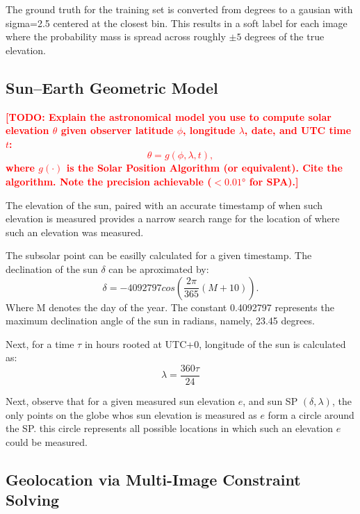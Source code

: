 \documentclass[conference]{IEEEtran}
\newcommand{\todo}[1]{\textcolor{red}{\textbf{[TODO: #1]}}}
\begin{document}
The ground truth for the training set is converted from degrees to a gausian with sigma=2.5 centered at the closest bin.
This results in a soft label for each image where the probability mass is spread across roughly $\pm5$ degrees of the true elevation.

\subsection{Sun--Earth Geometric Model}

\todo{Explain the astronomical model you use to compute solar elevation $\theta$
given observer latitude $\phi$, longitude $\lambda$, date, and UTC time $t$:
\begin{equation}
    \theta = g(\phi, \lambda, t),
    \label{eq:sunmodel}
\end{equation}
where $g(\cdot)$ is the Solar Position Algorithm (or equivalent). Cite the
algorithm. Note the precision achievable ($<0.01°$ for SPA).}

The elevation of the sun, paired with an accurate timestamp of when such elevation is measured provides a narrow search range for the location
of where such an elevation was measured.

The subsolar point can be easilly calculated for a given timestamp. The declination of the sun $\delta$ can be aproximated by:
\begin{equation}
    \delta = -4092797cos(\frac{2\pi}{365}(M+10)).
\end{equation}
Where M denotes the day of the year. The constant 0.4092797 represents the maximum declination angle of the sun in radians, namely,
23.45 degrees.

Next, for a time $\tau$ in hours rooted at UTC+0, longitude of the sun is calculated as:
\begin{equation}
    \lambda = \frac{360\tau}{24}
\end{equation}

Next, observe that for a given measured sun elevation $e$, and sun SP $(\delta, \lambda)$, the only points on the globe whos sun elevation is measured
as $e$ form a circle around the SP. this circle represents all possible locations in which such an elevation $e$ could be measured.

\subsection{Geolocation via Multi-Image Constraint Solving}
\end{document}
